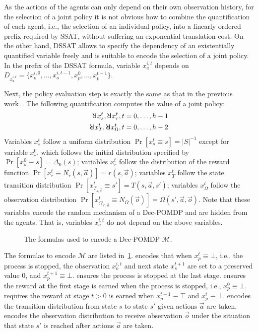 As the actions of the agents can only depend on their own observation history,
for the selection of a joint policy it is not obvious how to combine the quantification of each agent,
i.e., the selection of an individual policy,
into a linearly ordered prefix required by SSAT,
without suffering an exponential translation cost.
On the other hand, DSSAT allows to specify the dependency of an existentially quantified variable freely and is suitable to encode the selection of a joint policy.
In the prefix of the DSSAT formula,
variable $x_a^{i,t}$ depends on $D_{x_a^{i,t}}=\{x_o^{i,0},\ldots,x_o^{i,t-1},x_p^0,\ldots,x_p^{t-1}\}$.

Next, the policy evaluation step is exactly the same as that in the previous work~\cite{Salmon2020}.
The following quantification computes the value of a joint policy:
\begin{align*}
    \random{} x_s^t, \random{} x_r^t, t=0,\ldots,h-1 \\
    \random{} x_T^t, \random{} x_\Omega^t, t=0,\ldots,h-2
\end{align*}
Variables $x_s^t$ follow a uniform distribution $\Pr[x_s^t \equiv s]=|S|^{-1}$ except for variable $x_s^0$,
which follows the initial distribution specified by $\Pr[x_s^0 \equiv s]=\Delta_0(s)$;
variables $x_r^t$ follow the distribution of the reward function $\Pr[x_r^t \equiv N_r(s,\vec{a})]=r(s,\vec{a})$;
variables $x_T^t$ follow the state transition distribution $\Pr[x_{T_{s,\vec{a}}}^t \equiv s']=T(s,\vec{a},s')$;
variables $x_\Omega^t$ follow the observation distribution $\Pr[x_{\Omega_{s',\vec{a}}}^t \equiv N_\Omega(\vec{o})]=\Omega(s',\vec{a},\vec{o})$.
Note that these variables encode the random mechanism of a Dec-POMDP and are hidden from the agents.
That is, variables $x_a^{i,t}$ do not depend on the above variables.

\begin{figure}[t]
    \centering
    
    \caption{The formulas used to encode a Dec-POMDP $\mathcal{M}$.}
    \label{fig:dssat-dec-pomdp-formula}
\end{figure}

The formulas to encode $\mathcal{M}$ are listed in~\cref{fig:dssat-dec-pomdp-formula}.
 encodes that when $x_p^t \equiv \bot$, i.e., the process is stopped, the observation $x_o^{i,t}$ and next state $x_s^{t+1}$ are set to a preserved value $0$, and $x_p^{t+1} \equiv \bot$.
 ensures the process is stopped at the last stage.
 ensures the reward at the first stage is earned when the process is stopped, i.e., $x_p^0 \equiv \bot$.
 requires the reward at stage $t>0$ is earned when $x_p^{t-1} \equiv \top$ and $x_p^t \equiv \bot$.
 encodes the transition distribution from state $s$ to state $s'$ given actions $\vec{a}$ are taken.
 encodes the observation distribution to receive observation $\vec{o}$ under the situation that state $s'$ is reached after actions $\vec{a}$ are taken.


